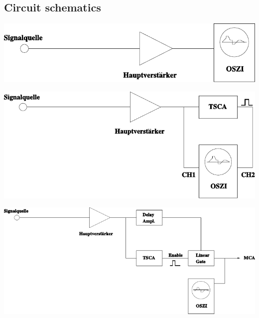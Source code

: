 \subsection{Circuit schematics}
%
\begin{center}
    \begin{adjustbox}{max width=\linewidth, keepaspectratio}
        \includegraphics[]{pdf/Schaltung1}
    \end{adjustbox}
    \label{fig:Schaltung1}
\end{center}
%
\begin{center}
    \begin{adjustbox}{max width=\linewidth, keepaspectratio}
        \includegraphics[]{pdf/Schaltung2}
    \end{adjustbox}
    \label{fig:Schaltung2}
\end{center}
%
\begin{center}
    \begin{adjustbox}{max width=\linewidth, keepaspectratio}
        \includegraphics[]{pdf/Schaltung3}
    \end{adjustbox}
    \label{fig:Schaltung3}
\end{center}
